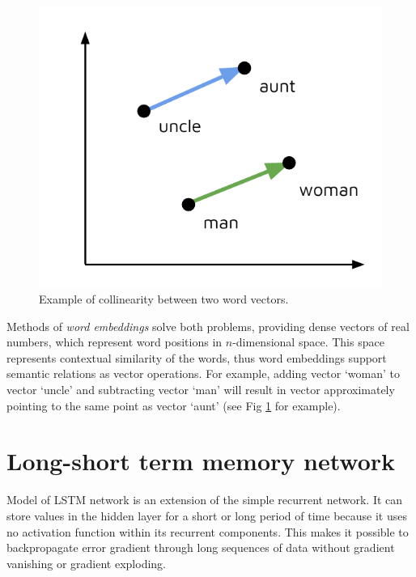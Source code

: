 \begin{figure}
\centering
\includegraphics{Figures/word_embeddings}
\decoRule
\caption[Word vectors]{Example of collinearity between two word vectors.}
\label{fig:word_embeddings}
\end{figure}

Methods of \emph{word embeddings} solve both problems, providing dense vectors of real numbers, which represent word positions in $n$-dimensional space. This space represents contextual similarity of the words, thus word embeddings support semantic relations as vector operations. For example, adding vector ‘woman’ to vector ‘uncle’ and subtracting vector ‘man’ will result in vector approximately pointing to the same point as vector ‘aunt’ (see Fig \ref{fig:word_embeddings} for example).

\section{Long-short term memory network}
Model of LSTM network is an extension of the simple recurrent network. It can store values in the hidden layer for a short or long period of time because it uses no activation function within its recurrent components. This makes it possible to backpropagate error gradient through long sequences of data without gradient vanishing or gradient exploding.

